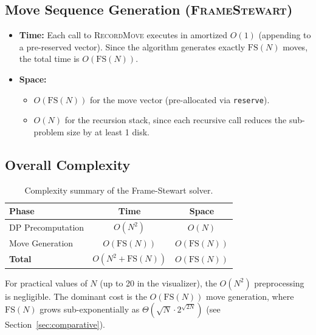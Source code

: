 \documentclass[12pt, a4paper]{article}
\begin{document}
\subsection{Move Sequence Generation (\textsc{FrameStewart})}

\begin{itemize}[leftmargin=2em]
    \item \textbf{Time:} Each call to \textsc{RecordMove} executes in amortized $O(1)$ (appending to a pre-reserved vector).
    Since the algorithm generates exactly $\text{FS}(N)$ moves, the total time is $O(\text{FS}(N))$.

    \item \textbf{Space:}
    \begin{itemize}
        \item $O(\text{FS}(N))$ for the move vector (pre-allocated via \texttt{reserve}).
        \item $O(N)$ for the recursion stack, since each recursive call reduces the sub-problem size by at least 1 disk.
    \end{itemize}
\end{itemize}

\subsection{Overall Complexity}

\begin{table}[h]
\centering
\begin{tabular}{lcc}
\toprule
\textbf{Phase} & \textbf{Time} & \textbf{Space} \\
\midrule
DP Precomputation & $O(N^2)$ & $O(N)$ \\
Move Generation   & $O(\text{FS}(N))$ & $O(\text{FS}(N))$ \\
\midrule
\textbf{Total}    & $O(N^2 + \text{FS}(N))$ & $O(\text{FS}(N))$ \\
\bottomrule
\end{tabular}
\caption{Complexity summary of the Frame-Stewart solver.}
\label{tab:complexity}
\end{table}

For practical values of $N$ (up to 20 in the visualizer), the $O(N^2)$ preprocessing is negligible. The dominant cost is the $O(\text{FS}(N))$ move generation, where $\text{FS}(N)$ grows sub-exponentially as $\Theta\!\left(\sqrt{N} \cdot 2^{\sqrt{2N}}\right)$ (see Section~\ref{sec:comparative}).


\end{document}
